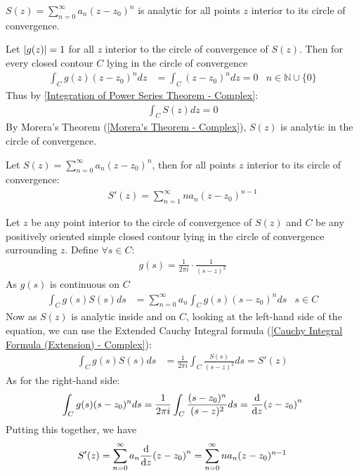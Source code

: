 \documentclass[12pt, english]{book}
\makeatletter
\renewenvironment{proof}[1][\proofname]{\par
	\pushQED{\qed}%
	\normalfont \topsep6\p@\@plus6\p@\relax
	\list{}{%
		\settowidth{\leftmargin}{\itshape\proofname:\hskip\labelsep}%
		\setlength{\labelwidth}{0pt}%
		\setlength{\itemindent}{-\leftmargin}%
	}%
	\item[\hskip\labelsep\itshape#1\@addpunct{:}]\ignorespaces
	}{ \popQED\endlist\@endpefalse}
\makeatother
\begin{document}
	\begin{corollary}
		\(S(z) = \sum_{n=0}^{\infty} a_n (z-z_0)^n\) is analytic for all points \(z\) interior to its circle of convergence.
	\end{corollary}
	\begin{proof}
		Let \(\abs{g(z)} = 1\) for all \(z\) interior to the circle of convergence of \(S(z)\).
		Then for every closed contour \(C\) lying in the circle of convergence
		\begin{align*}
			\int_{C} g(z) (z-z_0)^n dz &= \int_{C} (z-z_0)^n dz = 0 
				& n \in \mathbb{N} \cup \{0\}
		\end{align*}
		Thus by \cref{Integration of Power Series Theorem - Complex}:
		\begin{align*}
			\int_{C} S(z) dz = 0
		\end{align*}
		By Morera's Theorem (\cref{Morera's Theorem - Complex}), \(S(z)\) is analytic in the circle of convergence.
	\end{proof}
	
	\begin{theorem}
		\label{Differentiation of Power Series Theorem - Complex}
		Let \(S(z) = \sum_{n=0}^{\infty} a_n (z-z_0)^n\), then for all points \(z\) interior to its circle of convergence:
		\begin{align*}
			S'(z) = \sum_{n=1}^{\infty} na_n (z-z_0)^{n-1}
		\end{align*}
	\end{theorem}
	\begin{proof}
		Let \(z\) be any point interior to the circle of convergence of \(S(z)\) and \(C\) be any positively oriented simple closed contour lying in the circle of convergence surrounding \(z\). Define \(\forall s \in C\):
		\begin{align*}
			g(s) = \frac{1}{2\pi i} \cdot \frac{1}{(s-z)^2}
		\end{align*}
		As \(g(s)\) is continuous on \(C\)
		\begin{align*}
			\int_{C} g(s) S(s) ds &= \sum_{n=0}^{\infty} a_n \int_{C} g(s) (s-z_0)^n ds
				& s \in C
		\end{align*}
		Now as \(S(z)\) is analytic inside and on \(C\), looking at the left-hand side of the equation, we can use the Extended Cauchy Integral formula (\cref{Cauchy Integral Formula (Extension) - Complex}):
		\begin{align*}
			\int_{C} g(s) S(s) ds 
			&= \frac{1}{2\pi i} \int_{C} \frac{S(s)}{(s-z)^2} ds = S'(z)
		\end{align*}
		As for the right-hand side:
		\begin{align*}
			\int_{C} g(s) (s-z_0)^n ds = \frac{1}{2\pi i} \int_{C} \frac{(s-z_0)^n}{(s-z)^2} ds = \dv{z} (z-z_0)^n
		\end{align*}
		Putting this together, we have
		\begin{align*}
			S'(z) 
			= \sum_{n=0}^{\infty} a_n \dv{z}(z-z_0)^n 
			= \sum_{n=0}^{\infty} n a_n (z-z_0)^{n-1}
		\end{align*}
	\end{proof}
\end{document}
